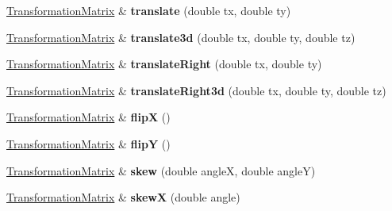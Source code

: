 \begin{DoxyCompactItemize}
\mbox{\hyperlink{class_web_core_1_1_transformation_matrix}{Transformation\+Matrix}} \& {\bfseries translate} (double tx, double ty)
\item 
\mbox{\label{class_web_core_1_1_transformation_matrix_a124c03dbbd1076f9df7f08b4eb4f3504}} 
\mbox{\hyperlink{class_web_core_1_1_transformation_matrix}{Transformation\+Matrix}} \& {\bfseries translate3d} (double tx, double ty, double tz)
\item 
\mbox{\label{class_web_core_1_1_transformation_matrix_afcd6741aa1a87e91ac139764f2d771d7}} 
\mbox{\hyperlink{class_web_core_1_1_transformation_matrix}{Transformation\+Matrix}} \& {\bfseries translate\+Right} (double tx, double ty)
\item 
\mbox{\label{class_web_core_1_1_transformation_matrix_a2959ae4a78b79567c0a37b14387f1a03}} 
\mbox{\hyperlink{class_web_core_1_1_transformation_matrix}{Transformation\+Matrix}} \& {\bfseries translate\+Right3d} (double tx, double ty, double tz)
\item 
\mbox{\label{class_web_core_1_1_transformation_matrix_a2766e42193ab9555403a43726f6ff8a8}} 
\mbox{\hyperlink{class_web_core_1_1_transformation_matrix}{Transformation\+Matrix}} \& {\bfseries flipX} ()
\item 
\mbox{\label{class_web_core_1_1_transformation_matrix_aec84729892d8cbe8e7c9cf5cbb724308}} 
\mbox{\hyperlink{class_web_core_1_1_transformation_matrix}{Transformation\+Matrix}} \& {\bfseries flipY} ()
\item 
\mbox{\label{class_web_core_1_1_transformation_matrix_a08b8d4d29dc0fb7c45cd5894ec50bd4f}} 
\mbox{\hyperlink{class_web_core_1_1_transformation_matrix}{Transformation\+Matrix}} \& {\bfseries skew} (double angleX, double angleY)
\item 
\mbox{\label{class_web_core_1_1_transformation_matrix_a0e23e5d444015d0abe2148ac0289e64e}} 
\mbox{\hyperlink{class_web_core_1_1_transformation_matrix}{Transformation\+Matrix}} \& {\bfseries skewX} (double angle)

\end{DoxyCompactItemize}

